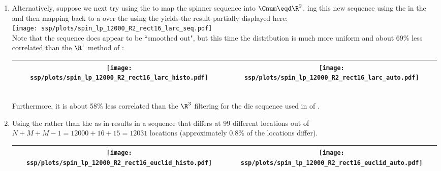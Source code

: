 \begin{example}
\begin{enumerate}
  \item \label{item:spin_lp_R2_rect16_larc}
        Alternatively, suppose we next try
        using the  
        to map the spinner sequence into $\Cnum\eqd\R^2$.
        ing this new sequence using the 
        in the  
        and then mapping back to a  over the  
        using the  yields the result partially displayed here:
        \\\texttt{[image: ssp/plots/spin\_lp\_12000\_R2\_rect16\_larc\_seq.pdf]}\\
        Note that the sequence does appear to be ``smoothed out", 
        but this time the distribution is much more uniform and about 
        69\% less correlated than the $\R^1$ method of :
        \\\begin{tabular}{|>{\scs}c|>{\scs}c|}
             \hline
             \texttt{[image: ssp/plots/spin\_lp\_12000\_R2\_rect16\_larc\_histo.pdf]}%
            &\texttt{[image: ssp/plots/spin\_lp\_12000\_R2\_rect16\_larc\_auto.pdf]}
           \\\hline
        \end{tabular}\\
        Furthermore, it is about 58\% less correlated than the $\R^3$ filtering for the die sequence
        used in  of .

  \item Using the  rather than the  as in 
        results in a sequence that differs at 99 different locations out of $N+M+M-1=12000+16+15=12031$ locations
        (approximately 0.8\% of the locations differ). %
        \\\begin{tabular}{|>{\scs}c|>{\scs}c|}
             \hline
             \texttt{[image: ssp/plots/spin\_lp\_12000\_R2\_rect16\_euclid\_histo.pdf]}%
            &\texttt{[image: ssp/plots/spin\_lp\_12000\_R2\_rect16\_euclid\_auto.pdf]}
           \\\hline
        \end{tabular}


\end{enumerate}
\end{example}
